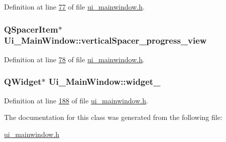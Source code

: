 Definition at line \hyperlink{a00139_source_l00077}{77} of file \hyperlink{a00139_source}{ui\+\_\+mainwindow.\+h}.

\hypertarget{a00080_a1c7dd277b3eb0ab06b980e95e1b0be29}{
\subsubsection[{vertical\+Spacer\+\_\+progress\+\_\+view}]{\setlength{\rightskip}{0pt plus 5cm}Q\+Spacer\+Item$\ast$ Ui\+\_\+\+Main\+Window\+::vertical\+Spacer\+\_\+progress\+\_\+view}}\label{a00080_a1c7dd277b3eb0ab06b980e95e1b0be29}


Definition at line \hyperlink{a00139_source_l00078}{78} of file \hyperlink{a00139_source}{ui\+\_\+mainwindow.\+h}.

\hypertarget{a00080_a7e6140f8a0c9dd88512918a04bc46441}{
\subsubsection[{widget\+\_\+20}]{\setlength{\rightskip}{0pt plus 5cm}Q\+Widget$\ast$ Ui\+\_\+\+Main\+Window\+::widget\+\_}}\label{a00080_a7e6140f8a0c9dd88512918a04bc46441}


Definition at line \hyperlink{a00139_source_l00188}{188} of file \hyperlink{a00139_source}{ui\+\_\+mainwindow.\+h}.



The documentation for this class was generated from the following file\+:\begin{DoxyCompactItemize}
\item 
\hyperlink{a00139}{ui\+\_\+mainwindow.\+h}\end{DoxyCompactItemize}

